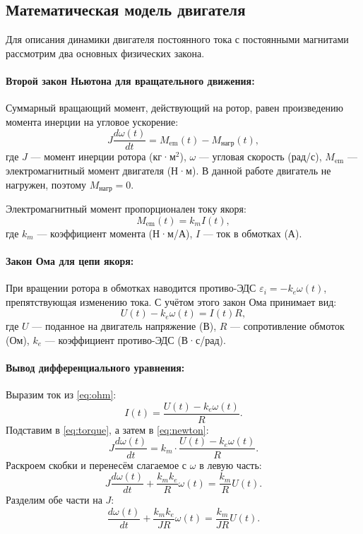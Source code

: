 \documentclass[a4paper, 12pt]{article}
\begin{document}
\subsection{Математическая модель двигателя}

Для описания динамики двигателя постоянного тока с постоянными магнитами рассмотрим два основных физических закона.

\paragraph{Второй закон Ньютона для вращательного движения:}
Суммарный вращающий момент, действующий на ротор, равен произведению момента инерции на угловое ускорение:
\begin{equation}
J \frac{d\omega(t)}{dt} = M_{\text{em}}(t) - M_{\text{нагр}}(t),
\label{eq:newton}
\end{equation}
где $J$ — момент инерции ротора (кг·м$^2$), $\omega$ — угловая скорость (рад/с), $M_{\text{em}}$ — электромагнитный момент двигателя (Н·м).
В данной работе двигатель не нагружен, поэтому $M_{\text{нагр}} = 0$.

Электромагнитный момент пропорционален току якоря:
\begin{equation}
M_{\text{em}}(t) = k_m I(t),
\label{eq:torque}
\end{equation}
где $k_m$ — коэффициент момента (Н·м/А), $I$ — ток в обмотках (А).

\paragraph{Закон Ома для цепи якоря:}
При вращении ротора в обмотках наводится противо-ЭДС $\varepsilon_i = -k_e \omega(t)$, препятствующая изменению тока. С учётом этого закон Ома принимает вид:
\begin{equation}
U(t) - k_e \omega(t) = I(t) R,
\label{eq:ohm}
\end{equation}
где $U$ — поданное на двигатель напряжение (В), $R$ — сопротивление обмоток (Ом), $k_e$ — коэффициент противо-ЭДС (В·с/рад).

\paragraph{Вывод дифференциального уравнения:}
Выразим ток из \eqref{eq:ohm}:
\begin{equation}
I(t) = \frac{U(t) - k_e \omega(t)}{R}.
\end{equation}
Подставим в \eqref{eq:torque}, а затем в \eqref{eq:newton}:
\begin{equation}
J \frac{d\omega(t)}{dt} = k_m \cdot \frac{U(t) - k_e \omega(t)}{R}.
\end{equation}
Раскроем скобки и перенесём слагаемое с $\omega$ в левую часть:
\begin{equation}
J \frac{d\omega(t)}{dt} + \frac{k_m k_e}{R} \omega(t) = \frac{k_m}{R} U(t).
\end{equation}
Разделим обе части на $J$:
\begin{equation}
\frac{d\omega(t)}{dt} + \frac{k_m k_e}{JR} \omega(t) = \frac{k_m}{JR} U(t).
\label{eq:diff_raw}
\end{equation}
\end{document}
